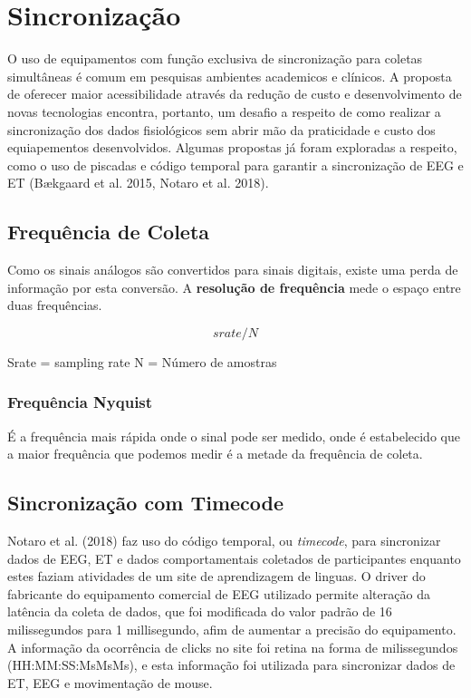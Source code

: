 \chapter{Sincronização}

O uso de equipamentos com função exclusiva de sincronização para coletas simultâneas é comum em pesquisas ambientes academicos e clínicos.
A proposta de oferecer maior acessibilidade através da redução de custo e desenvolvimento de novas tecnologias encontra, portanto, um desafio a respeito 
de como realizar a sincronização dos dados fisiológicos sem abrir mão da praticidade e custo dos equiapementos desenvolvidos. 
Algumas propostas já foram exploradas a respeito, como o uso de piscadas e código temporal para garantir a sincronização de EEG e ET (Bækgaard et al. 2015, Notaro et al. 2018).

\section{Frequência de Coleta}
Como os sinais análogos são convertidos para sinais digitais, existe uma perda de informação por esta conversão. 
A \textbf{resolução de frequência} mede o espaço entre duas frequências. 

$$srate/N$$

Srate = sampling rate 
N = Número de amostras

\subsection{Frequência Nyquist}
É a frequência mais rápida onde o sinal pode ser medido, onde é estabelecido que a maior frequência que podemos medir é a metade 
da frequência de coleta.


\section{Sincronização com Timecode}
Notaro et al. (2018) faz uso do código temporal, ou \textit{timecode}, para sincronizar dados de EEG, ET e dados comportamentais 
coletados de participantes enquanto estes faziam atividades de um site de aprendizagem de linguas. O driver
do fabricante do equipamento comercial de EEG utilizado permite alteração da latência da coleta de dados, que
foi modificada do valor padrão de 16 milissegundos para 1 millisegundo, afim de aumentar a precisão do equipamento.
A informação da ocorrência de clicks no site foi retina na forma de milissegundos (HH:MM:SS:MsMsMs), e esta informação foi utilizada 
para sincronizar dados de ET, EEG e movimentação de mouse. 

